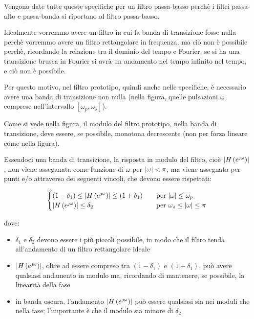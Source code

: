 \begin{tcolorbox}
    Vengono date tutte queste specifiche per un filtro passa-basso perchè i filtri passa-alto e passa-banda si riportano al filtro passa-basso. 
\end{tcolorbox}

Idealmente vorremmo avere un filtro in cui la banda di transizione fosse nulla perchè vorremmo avere un filtro rettangolare in frequenza, 
ma ciò non è possibile perchè, ricordando la relazione tra il dominio del tempo e Fourier, se si ha una transizione brusca in Fourier si avrà un andamento nel tempo infinito nel tempo, e ciò non è possibile. \newline 

Per questo motivo, nel filtro prototipo, quindi anche nelle specifiche, è necessario avere una banda di transizione non nulla (nella figura, quelle pulsazioni $\omega$ comprese nell'intervallo $\left[ \omega_p, \omega_s\right]$). \newline 

Come si vede nella figura, il modulo del filtro prototipo, nella banda di transizione, deve essere, se possibile, monotona decrescente (non per forza lineare come nella figura). \newline 

\newpage

Essendoci una banda di transizione, la risposta in modulo del filtro, cioè $\abs{H \left(e^{\jmath \omega}\right)}$, non viene asseganata come funzione di 
$\omega$ per $\abs{\omega} < \pi$, ma viene assegnata per punti e/o attraverso dei seguenti vincoli, che devono essere rispettati: 

{
    \Large 
    \begin{equation}
        \begin{cases}
            \left(1 - \delta_1\right) \leq \abs{H \left(e^{\jmath \omega}\right)} \leq \left(1 + \delta_1\right) 
            \quad 
            &\text{per }
            \abs{\omega} \leq \omega_p 
            \\
            \abs{H \left(e^{\jmath \omega}\right)} \leq \delta_2 
            \quad 
            &\text{per }
            \omega_s \leq \abs{\omega} \leq \pi  
        \end{cases}
    \end{equation}
}

dove: 

\begin{itemize}
    \item $\delta_1$ e $\delta_2$ devono essere i più piccoli possibile, in modo che il filtro tenda all'andamento di un filtro rettangolare ideale 
    \item $\abs{H \left(e^{\jmath \omega}\right)}$, oltre ad essere compreso tra $\left(1 - \delta_1\right)$ e $\left(1 + \delta_1\right)$, può avere qualsiasi andamento in modulo ma, ricordando di mantenere, se possibile, la linearità della fase 
    \item in banda oscura, l'andamento $\abs{H \left(e^{\jmath \omega}\right)}$ può essere qualsiasi sia nei moduli che nella fase; l'importante è che il modulo sia minore di $\delta_2$
\end{itemize}


